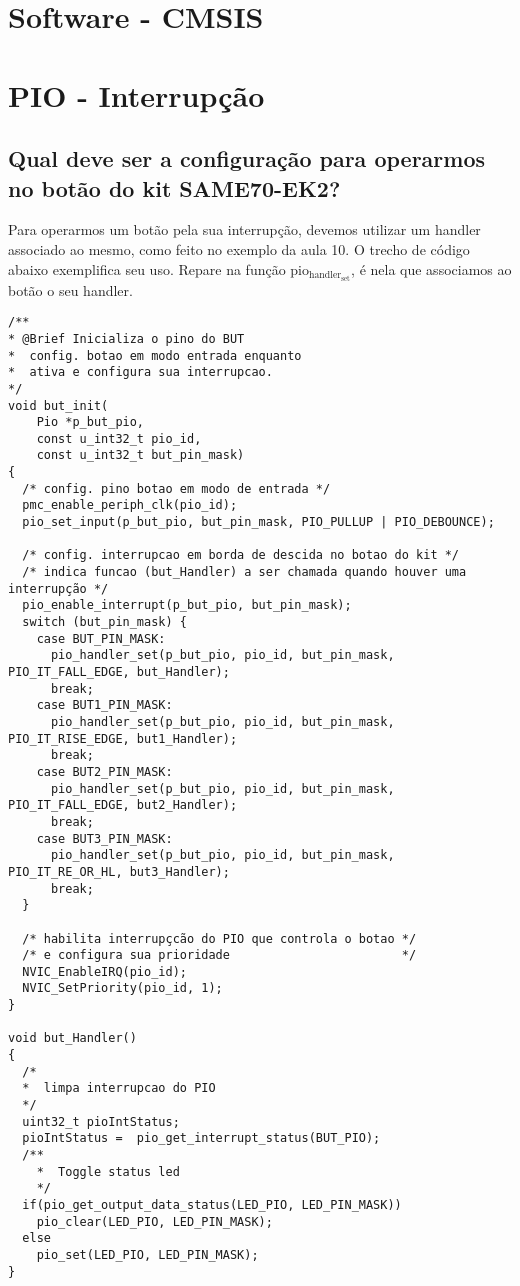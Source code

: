 \documentclass[11pt]{article}
\begin{document}
\section{Software - CMSIS}
\label{sec:orgheadline12}

\section{PIO - Interrupção}
\label{sec:orgheadline16}
\subsection{Qual deve ser a configuração para operarmos no botão do kit SAME70-EK2?}
\label{sec:orgheadline13}
Para operarmos um botão pela sua interrupção, devemos utilizar um handler
associado ao mesmo, como feito no exemplo da aula 10. O trecho de código abaixo
exemplifica seu uso. Repare na função pio\(_{\text{handler}}_{\text{set}}\), é nela que associamos ao
botão o seu handler.

\begin{verbatim}
/**
* @Brief Inicializa o pino do BUT
*  config. botao em modo entrada enquanto
*  ativa e configura sua interrupcao.
*/
void but_init(
    Pio *p_but_pio,
    const u_int32_t pio_id,
    const u_int32_t but_pin_mask)
{
  /* config. pino botao em modo de entrada */
  pmc_enable_periph_clk(pio_id);
  pio_set_input(p_but_pio, but_pin_mask, PIO_PULLUP | PIO_DEBOUNCE);

  /* config. interrupcao em borda de descida no botao do kit */
  /* indica funcao (but_Handler) a ser chamada quando houver uma interrupção */
  pio_enable_interrupt(p_but_pio, but_pin_mask);
  switch (but_pin_mask) {
    case BUT_PIN_MASK:
      pio_handler_set(p_but_pio, pio_id, but_pin_mask, PIO_IT_FALL_EDGE, but_Handler);
      break;
    case BUT1_PIN_MASK:
      pio_handler_set(p_but_pio, pio_id, but_pin_mask, PIO_IT_RISE_EDGE, but1_Handler);
      break;
    case BUT2_PIN_MASK:
      pio_handler_set(p_but_pio, pio_id, but_pin_mask, PIO_IT_FALL_EDGE, but2_Handler);
      break;
    case BUT3_PIN_MASK:
      pio_handler_set(p_but_pio, pio_id, but_pin_mask, PIO_IT_RE_OR_HL, but3_Handler);
      break;
  }

  /* habilita interrupçcão do PIO que controla o botao */
  /* e configura sua prioridade                        */
  NVIC_EnableIRQ(pio_id);
  NVIC_SetPriority(pio_id, 1);
}

void but_Handler()
{
  /*
  *  limpa interrupcao do PIO
  */
  uint32_t pioIntStatus;
  pioIntStatus =  pio_get_interrupt_status(BUT_PIO);
  /**
    *  Toggle status led
    */
  if(pio_get_output_data_status(LED_PIO, LED_PIN_MASK))
    pio_clear(LED_PIO, LED_PIN_MASK);
  else
    pio_set(LED_PIO, LED_PIN_MASK);
}
\end{verbatim}
\end{document}
